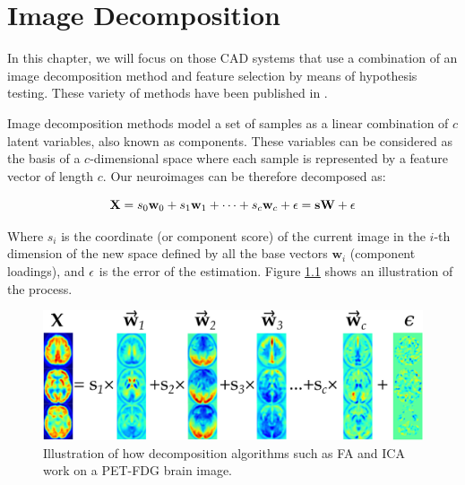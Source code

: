 \chapter{Image Decomposition}\label{ch:decomposition}

In this chapter, we will focus on those \ac{CAD} systems that use a combination of an image decomposition method and feature selection by means of hypothesis testing. These variety of methods have been published in \cite{Martinez201141,Martinez-Murcia20129676,Martinez-Murcia2013255,Martinez-Murcia201458}. 

Image decomposition methods model a set of samples as a linear combination of $c$ latent variables, also known as components. These variables can be considered as the basis of a $c$-dimensional space where each sample is represented by a feature vector of length $c$. Our neuroimages can be therefore decomposed as: 

\begin{equation}\label{eq:generalDecomposition}
	\mathbf{X} = s_0 \mathbf{w}_0 + s_1 \mathbf{w}_1 + \dots + s_c \mathbf{w}_c + \boldmath\epsilon = \mathbf{s}\mathbf{W} + \boldmath\epsilon
\end{equation}

Where $s_i$ is the coordinate (or component score) of the current image in the $i$-th dimension of the new space defined by all the base vectors $\mathbf{w}_i$ (component loadings), and $\boldmath\epsilon$ is the error of the estimation. Figure \ref{fig:decomposition_overview} shows an illustration of the process. 

\begin{figure}[tph]
	\centering
	\includegraphics[width=0.9\linewidth]{Graphics/ch4/decomposition_overview}
	\caption[Illustration of how decomposition algorithms work.]{Illustration of how decomposition algorithms such as \ac{FA} and \ac{ICA} work on a \ac{PET}-FDG brain image.}
	\label{fig:decomposition_overview}
\end{figure}

